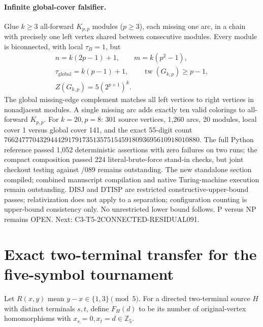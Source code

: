 \documentclass[11pt]{article}
\begin{document}
\paragraph{Infinite global-cover falsifier.}
Glue $k\ge3$ all-forward $K_{p,p}$ modules ($p\ge3$), each missing
one arc, in a chain with precisely one left vertex shared between
consecutive modules. Every module is biconnected, with local
$\tau_B=1$, but
\[
\begin{gathered}
n=k(2p-1)+1,\qquad m=k(p^2-1),\\
\tau_{\mathrm{global}}=k(p-1)+1,\qquad
\operatorname{tw}(G_{k,p})\ge p-1,\\
Z(G_{k,p})=5\left(2^{p+1}\right)^k.
\end{gathered}
\]
The global missing-edge complement matches all left vertices
to right vertices in nonadjacent modules. A single missing arc adds
exactly ten valid colorings to all-forward $K_{p,p}$.
For $k=20,p=8$: 301 source vertices, 1,260 arcs, 20 modules,
local cover 1 versus global cover 141, and the exact 55-digit
count $7662477704329444291791735135751545918093695610918010880$.
The full Python reference passed 1,052 deterministic assertions
with zero failures on two runs; the compact composition passed 224
literal-brute-force stand-in checks, but joint checkout testing
against /089 remains outstanding. The new standalone section
compiled; combined manuscript compilation and native Turing-machine
execution remain outstanding. DISJ and DTISP are restricted
constructive-upper-bound passes; relativization does not apply to a
separation; configuration counting is upper-bound consistency only.
No unrestricted lower bound follows. P versus NP remains OPEN.
Next: C3-T5-2CONNECTED-RESIDUAL091.


\section{Exact two-terminal transfer for the five-symbol tournament}
\label{sec:tmr3-t5-two-terminal091}
Let $R(x,y)$ mean $y-x\in\{1,3\}\pmod5$. For a directed
two-terminal source $H$ with distinct terminals $s,t$, define
$F_H(d)$ to be its number of original-vertex homomorphisms with
$x_s=0,x_t=d\in\mathbb Z_5$.
\end{document}
